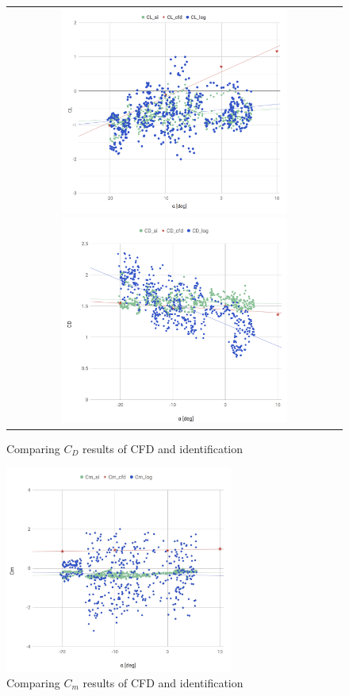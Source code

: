 \begin{figure}[htbp]
	\centering
		\begin{tabular}{c}
			\begin{minipage}{0.5\hsize}
				\centering
					\includegraphics[clip,width=7.5cm,bb=0 0 1912 1743]{./z_figure_files/chapter5/cfd_L.jpeg}
					\caption{\small{Comparing $C_L$ results of CFD and identification}}
					\label{fig:cfd_L}
			\end{minipage}
			\begin{minipage}{0.5\hsize}
				\centering
					\includegraphics[clip,width=7.5cm,bb=0 0 1819 1662]{./z_figure_files/chapter5/cfd_D.jpeg}
					\caption{\small{Comparing $C_D$ results of CFD and identification}}
					\label{fig:cfd_D}
			\end{minipage}
		\end{tabular}
\end{figure}
\begin{figure}[H]
  \centering
    \includegraphics[clip,width=7.5cm,bb=0 0 1832 1662]{./z_figure_files/chapter5/cfd_m.jpeg}
    \caption{\small{Comparing $C_m$ results of CFD and identification}}
    \label{fig:cfd_Ma}
\end{figure}
